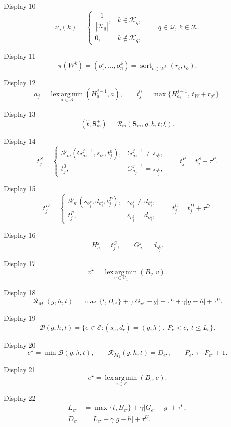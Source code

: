 \documentclass[a4paper,11pt]{article}
\providecommand{\mathscr}[1]{\mathcal{#1}}
\begin{document}
\noindent Display 10
\[
\nu_q(k)=
\begin{cases}
\dfrac{1}{|\mathcal K_q|}, & k\in\mathcal K_q,\\
0, & k\notin\mathcal K_q,
\end{cases}
\qquad q\in\mathcal Q,\ k\in\mathcal K.
\tag{10}
\]

\noindent Display 11
\[
\pi(W^k)=\left(o_1^k,\ldots,o_n^k\right)
=\operatorname{sort}_{o\in W^k}(r_o,\iota_o).
\tag{11}
\]

\noindent Display 12
\[
a_j=\underset{a\in\mathcal A}{\operatorname{lex\,arg\,min}}
(H_a^{j-1},a),
\qquad
t_j^0=\max\{H_{a_j}^{j-1},\,t_W+r_{o_j^k}\}.
\tag{12}
\]

\noindent Display 13
\[
(\widehat t,\mathbf S_m^+)
=\mathscr R_m(\mathbf S_m,g,h,t;\xi).
\tag{13}
\]

\noindent Display 14
\[
t_j^S=
\begin{cases}
\mathcal R_m(G_{a_j}^{j-1},s_{o_j^k},t_j^0),
& G_{a_j}^{j-1}\neq s_{o_j^k},\\
t_j^0, & G_{a_j}^{j-1}=s_{o_j^k},
\end{cases}
\qquad
t_j^P=t_j^S+\tau^P.
\tag{14}
\]

\noindent Display 15
\[
t_j^D=
\begin{cases}
\mathcal R_m(s_{o_j^k},d_{o_j^k},t_j^P),
& s_{o_j^k}\neq d_{o_j^k},\\
t_j^P, & s_{o_j^k}=d_{o_j^k},
\end{cases}
\qquad
t_j^C=t_j^D+\tau^D.
\tag{15}
\]

\noindent Display 16
\[
H_{a_j}^{j}=t_j^C,\qquad
G_{a_j}^{j}=d_{o_j^k}.
\tag{16}
\]

\noindent Display 17
\[
v^\star=\underset{v\in\mathcal V_1}{\operatorname{lex\,arg\,min}}(B_v,v).
\tag{17}
\]

\noindent Display 18
\[
\mathcal R_{M_1}(g,h,t)
=\max\{t,B_{v^\star}\}
+\gamma|G_{v^\star}-g|
+\tau^L+\gamma|g-h|+\tau^U.
\tag{18}
\]

\noindent Display 19
\[
\mathcal B(g,h,t)=
\{e\in\mathcal E:(\bar s_e,\bar d_e)=(g,h),\ P_e<c,\ t\leq L_e\}.
\tag{19}
\]

\noindent Display 20
\[
e^\star=\min\mathcal B(g,h,t),\qquad
\mathcal R_{M_2}(g,h,t)=D_{e^\star},\qquad
P_{e^\star}\leftarrow P_{e^\star}+1.
\tag{20}
\]

\noindent Display 21
\[
e^\star=\underset{e\in\mathcal E}{\operatorname{lex\,arg\,min}}(B_e,e).
\tag{21}
\]

\noindent Display 22
\[
\begin{aligned}
L_{e^\star}&=\max\{t,B_{e^\star}\}
+\gamma|G_{e^\star}-g|+\tau^L,\\
D_{e^\star}&=L_{e^\star}+\gamma|g-h|+\tau^U.
\end{aligned}
\tag{22}
\]
\end{document}
